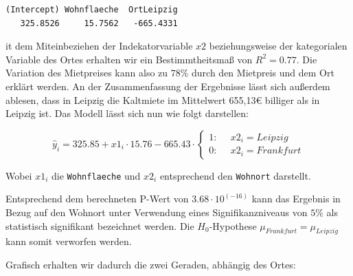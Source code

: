 \documentclass[
  a4paper,
  DIV=11]{scrartcl}
\begin{document}
\begin{verbatim}
(Intercept) Wohnflaeche  OrtLeipzig 
   325.8526     15.7562   -665.4331 
\end{verbatim}

it dem Miteinbeziehen der Indekatorvariable \(x2\) beziehungsweise der
kategorialen Variable des Ortes erhalten wir ein Bestimmtheitsmaß von
\(R^2 = 0.77\). Die Variation des Mietpreises kann also zu \(78\)\%
durch den Mietpreis und dem Ort erklärt werden. An der Zusammenfassung
der Ergebnisse lässt sich außerdem ablesen, dass in Leipzig die
Kaltmiete im Mittelwert 655,13€ billiger als in Leipzig ist. Das Modell
lässt sich nun wie folgt darstellen:

\[ 
\hat{y}_i = 
325.85 
+ x1_i \cdot 
15.76
-665.43 \cdot 
\begin{cases} 
\text{1}: & \text{ $x2_i = Leipzig$}\\
\text{0}: & \text{ $x2_i = Frankfurt$}
\end{cases} 
\]

Wobei \(x1_i\) die \texttt{Wohnflaeche} und \(x2_i\) entsprechend den
\texttt{Wohnort} darstellt.

Entsprechend dem berechneten P-Wert von \(3.68 \cdot 10^(-16)\) kann das
Ergebnis in Bezug auf den Wohnort unter Verwendung eines
Signifikanzniveaus von \(5\%\) als statistisch signifikant bezeichnet
werden. Die \(H_0\)-Hypothese \(\mu_{Frankfurt} = \mu_{Leipzig}\) kann
somit verworfen werden.

Grafisch erhalten wir dadurch die zwei Geraden, abhängig des Ortes:
\end{document}
